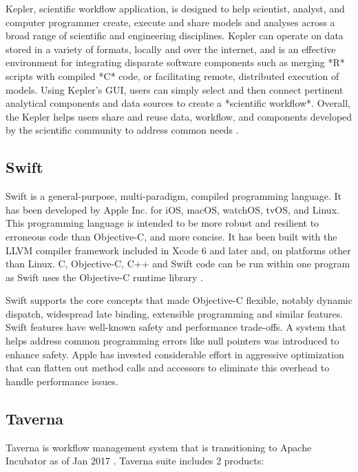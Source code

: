    Kepler, scientific workflow application, is designed to help
   scientist, analyst, and computer programmer create, execute and
   share models and analyses across a broad range of scientific and
   engineering disciplines.  Kepler can operate on data stored in a
   variety of formats, locally and over the internet, and is an
   effective environment for integrating disparate software components
   such as merging *R* scripts with compiled *C* code, or facilitating
   remote, distributed execution of models. Using Kepler's GUI, users
   can simply select and then connect pertinent analytical components
   and data sources to create a *scientific workflow*. Overall, the
   Kepler helps users share and reuse data, workflow, and components
   developed by the scientific community to address common needs
   \cite{www-kepler}.

\subsection{Swift}

   Swift is a general-purpose, multi-paradigm, compiled programming
   language. It has been developed by Apple Inc. for iOS, macOS,
   watchOS, tvOS, and Linux. This programming language is intended to
   be more robust and resilient to erroneous code than Objective-C,
   and more concise. It has been built with the LLVM compiler
   framework included in Xcode 6 and later and, on platforms other
   than Linux. C, Objective-C, C++ and Swift code can be run within
   one program as Swift uses the Objective-C runtime
   library \cite{www-swift-wikipedia}.

   Swift supports the core concepts that made Objective-C flexible,
   notably dynamic dispatch, widespread late binding, extensible
   programming and similar features. Swift features have well-known
   safety and performance trade-offs. A system that helps address
   common programming errors like null pointers was introduced to
   enhance safety. Apple has invested considerable effort in
   aggressive optimization that can flatten out method calls and
   accessors to eliminate this overhead to handle performance issues.
      
\subsection{Taverna}

   Taverna is workflow management system that is transitioning to
   Apache Incubator as of Jan 2017 \cite{www-taverna}. Taverna
    suite includes 2 products:

